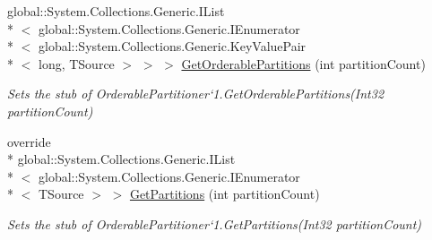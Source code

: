 \begin{DoxyCompactItemize}
global\-::\-System.\-Collections.\-Generic.\-I\-List\\*
$<$ global\-::\-System.\-Collections.\-Generic.\-I\-Enumerator\\*
$<$ global\-::\-System.\-Collections.\-Generic.\-Key\-Value\-Pair\\*
$<$ long, T\-Source $>$ $>$ $>$ \hyperlink{class_system_1_1_collections_1_1_concurrent_1_1_fakes_1_1_stub_orderable_partitioner_3_01_t_source_01_4_aa72229a2edc55d1095cb700b57dc84dd}{Get\-Orderable\-Partitions} (int partition\-Count)
\begin{DoxyCompactList}\small\item\em Sets the stub of Orderable\-Partitioner`1.Get\-Orderable\-Partitions(\-Int32 partition\-Count)\end{DoxyCompactList}\item 
override \\*
global\-::\-System.\-Collections.\-Generic.\-I\-List\\*
$<$ global\-::\-System.\-Collections.\-Generic.\-I\-Enumerator\\*
$<$ T\-Source $>$ $>$ \hyperlink{class_system_1_1_collections_1_1_concurrent_1_1_fakes_1_1_stub_orderable_partitioner_3_01_t_source_01_4_af324d0db2367c222b3d4cf800d163c19}{Get\-Partitions} (int partition\-Count)
\begin{DoxyCompactList}\small\item\em Sets the stub of Orderable\-Partitioner`1.Get\-Partitions(\-Int32 partition\-Count)\end{DoxyCompactList}\end{DoxyCompactItemize}
